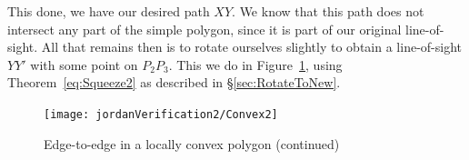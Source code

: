 \linebreak

This done, we have our desired path $XY$. We know that this path does not intersect any part of the simple polygon, since it is part of our original line-of-sight. All that remains then is to rotate ourselves slightly to obtain a line-of-sight $YY'$ with some point on $P_2P_3$. This we do in Figure~\ref{fig:Convex2}, using Theorem~\ref{eq:Squeeze2} as described in \S\ref{sec:RotateToNew}. 

\begin{figure}
\centering\texttt{[image: jordanVerification2/Convex2]}
\caption{Edge-to-edge in a locally convex polygon (continued)}
\label{fig:Convex2}
\end{figure}

